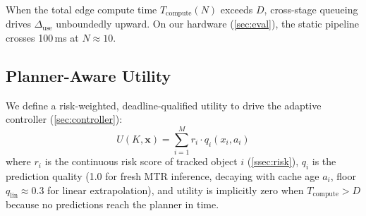 When the total edge compute time $T_{\mathrm{compute}}(N)$ exceeds
$D$, cross-stage queueing drives $\Delta_{\mathrm{use}}$ unboundedly
upward.  On our hardware (\cref{sec:eval}), the static pipeline
crosses 100\,ms at $N \approx 10$.

\subsection{Planner-Aware Utility}

We define a risk-weighted, deadline-qualified utility to drive the
adaptive controller (\cref{sec:controller}):
\begin{equation}
  U(K, \mathbf{x}) = \sum_{i=1}^{M} r_i \cdot q_i(x_i, a_i)
  \label{eq:utility}
\end{equation}
where $r_i$ is the continuous risk score of tracked object $i$
(\cref{ssec:risk}), $q_i$ is the prediction quality (1.0 for fresh
MTR inference, decaying with cache age $a_i$, floor $q_{\mathrm{lin}}
\approx 0.3$ for linear extrapolation), and utility is implicitly zero
when $T_{\mathrm{compute}} > D$ because no predictions reach the
planner in time.
